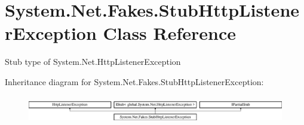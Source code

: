 \hypertarget{class_system_1_1_net_1_1_fakes_1_1_stub_http_listener_exception}{\section{System.\-Net.\-Fakes.\-Stub\-Http\-Listener\-Exception Class Reference}
\label{class_system_1_1_net_1_1_fakes_1_1_stub_http_listener_exception}
}


Stub type of System.\-Net.\-Http\-Listener\-Exception 


Inheritance diagram for System.\-Net.\-Fakes.\-Stub\-Http\-Listener\-Exception\-:\begin{figure}[H]
\begin{center}
\leavevmode
\includegraphics[height=1.248607cm]{class_system_1_1_net_1_1_fakes_1_1_stub_http_listener_exception}
\end{center}
\end{figure}
